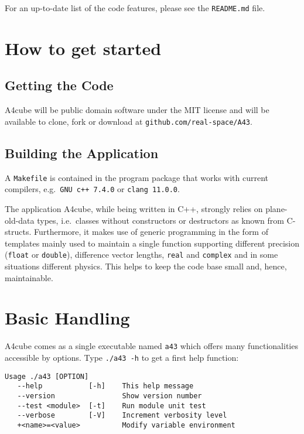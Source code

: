 \documentclass[oribibl]{llncs}
\newcommand{\ttt}[1]{\texttt{#1}}
\newcommand{\codename}{A4cube}
\begin{document}
\noindent
For an up-to-date list of the code features, please see the \ttt{README.md} file.

\section{How to get started} \label{sec:how-to-get-started}
%
\subsection{Getting the Code} \label{sec:getting-the-code}
\codename{} will be public domain software under the MIT license
and will be available to clone, fork or download at \ttt{github.com/real-space/A43}. 

\subsection{Building the Application} \label{sec:compiling}
%
A \ttt{Makefile} is contained in the program package that works with current compilers, e.g.~\ttt{GNU c++ 7.4.0} or \ttt{clang 11.0.0}.

The application \codename{}, while being written in C++, strongly relies on plane-old-data types,
i.e.~classes without constructors or destructors as known from C-structs.
Furthermore, it makes use of generic programming in the form of templates
mainly used to maintain a single function supporting different precision (\ttt{float} or \ttt{double}), 
difference vector lengths, \ttt{real} and \ttt{complex} and in some situations different physics.
This helps to keep the code base small and, hence, maintainable.

\section{Basic Handling} \label{sec:basic-handling}
%
\codename{} comes as a single executable named \ttt{a43} which
offers many functionalities accessible by options. Type \ttt{./a43 -h}
to get a first help function:
\begin{verbatim}
Usage ./a43 [OPTION]
   --help           [-h]	This help message
   --version            	Show version number
   --test <module>  [-t]	Run module unit test
   --verbose        [-V]	Increment verbosity level
   +<name>=<value>      	Modify variable environment
\end{verbatim}
\end{document}
